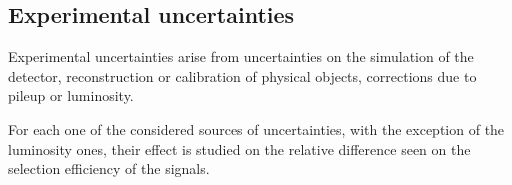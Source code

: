 


\subsection{Experimental uncertainties}
\label{subsec:signals:systs:exp}

Experimental uncertainties arise from uncertainties on the simulation of the detector, reconstruction or calibration of physical objects, corrections due to pileup or luminosity.

For each one of the considered sources of uncertainties, with the exception of the luminosity ones, their effect is studied on the relative difference seen on the selection efficiency of the signals.


